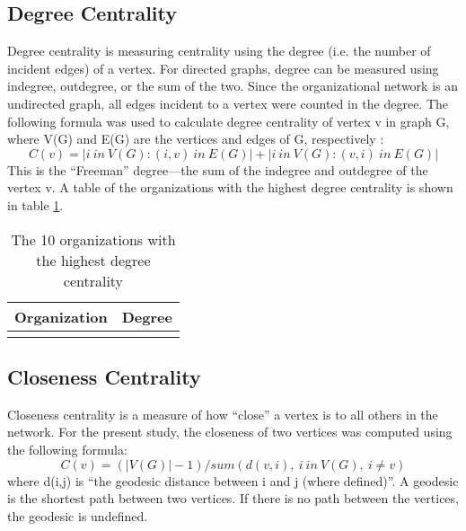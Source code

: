 \subsection{Degree Centrality}
Degree centrality is measuring centrality using the degree (i.e. the number of incident edges) of a vertex. For directed graphs, degree can be measured using indegree, outdegree, or the sum of the two. Since the organizational network is an undirected graph, all edges incident to a vertex were counted in the degree. The following formula was used to calculate degree centrality of vertex v in graph G, where V(G) and E(G) are the vertices and edges of G, respectively : 
\begin{equation*}
C(v) = | {i\:in\:V(G) : (i,v)\:in\:E(G)} |+|{i\:in\:V(G) : (v,i)\:in\:E(G)}|
\end{equation*}
This is the ``Freeman'' degree---the sum of the indegree and outdegree of the vertex v. A table of the organizations with the highest degree centrality is shown in table \ref{tab:degree}.

\begin{table}
	\begin{tabular}{l|c}%
		\bfseries Organization & \bfseries Degree%
		\csvreader[head to column names]{degree.csv}{}%
		{\\\hline\organizationa & \scorea}%
	\end{tabular}
	\centering
	\caption{The 10 organizations with the highest degree centrality}\label{tab:degree}
\end{table}
\subsection{Closeness Centrality}
Closeness centrality is a measure of how ``close'' a vertex is to all others in the network. For the present study, the closeness of two vertices was computed using the following formula:
\begin{equation*}
	C(v) = (|V(G)|-1)/sum( d(v,i),\:i\:in\:V(G),\:i \neq v )
\end{equation*}
where d(i,j) is ``the geodesic distance between i and j (where defined)''\cite{butts}. A geodesic is the shortest path between two vertices. If there is no path between the vertices, the geodesic is undefined. 

